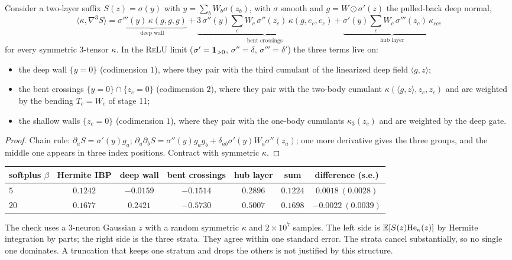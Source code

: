 \begin{theorem}\label{thm:strata}
Consider a two-layer suffix $S(z)=\sigma(y)$ with $y=\sum_bW_b\sigma(z_b)$, with $\sigma$ smooth and $g=W\odot\sigma'(z)$ the pulled-back deep normal,
\[
\langle\kappa,\nabla^3S\rangle=\underbrace{\sigma'''(y)\,\kappa(g,g,g)}_{\text{deep wall}}
+\underbrace{3\,\sigma''(y)\sum_cW_c\,\sigma''(z_c)\,\kappa(g,e_c,e_c)}_{\text{bent crossings}}
+\underbrace{\sigma'(y)\sum_cW_c\,\sigma'''(z_c)\,\kappa_{ccc}}_{\text{hub layer}}
\]
for every symmetric $3$-tensor $\kappa$. In the \textsc{ReLU} limit ($\sigma'=\mathbf 1_{>0}$, $\sigma''=\delta$, $\sigma'''=\delta'$) the three terms live on:
\begin{itemize}[leftmargin=*]
\item the deep wall $\{y=0\}$ (codimension $1$), where they pair with the third cumulant of the linearized deep field $\langle g,z\rangle$;
\item the bent crossings $\{y=0\}\cap\{z_c=0\}$ (codimension $2$), where they pair with the two-body cumulant
$\kappa(\langle g,z\rangle,z_c,z_c)$ and are weighted by the bending $T_c=W_c$ of stage 11;
\item the shallow walls $\{z_c=0\}$ (codimension $1$), where they pair with the one-body cumulants $\kappa_3(z_c)$ and are weighted by the deep
gate.
\end{itemize}
\end{theorem}
\begin{proof}
Chain rule: $\partial_aS=\sigma'(y)g_a$; $\partial_a\partial_bS=\sigma''(y)g_ag_b+\delta_{ab}\sigma'(y)W_a\sigma''(z_a)$; one more derivative gives the three
groups, and the middle one appears in three index positions. Contract with symmetric $\kappa$.
\end{proof}
\begin{center}\small
\begin{tabular}{lcccccc}\toprule
softplus $\beta$ & Hermite IBP & deep wall & bent crossings & hub layer & sum & difference (s.e.)\\\midrule
$5$ & $0.1242$ & $-0.0159$ & $-0.1514$ & $0.2896$ & $0.1224$ & $0.0018\ (0.0028)$\\
$20$ & $0.1677$ & $0.2421$ & $-0.5730$ & $0.5007$ & $0.1698$ & $-0.0022\ (0.0039)$\\\bottomrule
\end{tabular}
\end{center}
The check uses a $3$-neuron Gaussian $z$ with a random symmetric $\kappa$ and $2\times10^7$ samples. The left side is
$\mathbb E[S(z)\mathrm{He}_\kappa(z)]$ by Hermite integration by parts; the right side is the three strata. They agree within one standard error.
The strata cancel substantially, so no single one dominates. A truncation that keeps one stratum and drops the others is not
justified by this structure.

